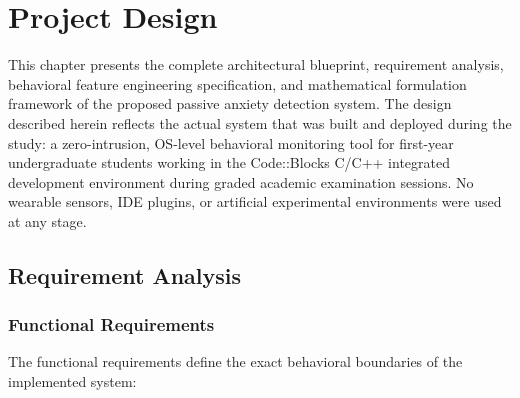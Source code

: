 \chapter{Project Design}
\label{ch:project_design}

This chapter presents the complete architectural blueprint, requirement analysis, behavioral feature engineering specification, and mathematical formulation framework of the proposed passive anxiety detection system. The design described herein reflects the actual system that was built and deployed during the study: a zero-intrusion, OS-level behavioral monitoring tool for first-year undergraduate students working in the Code::Blocks C/C++ integrated development environment during graded academic examination sessions. No wearable sensors, IDE plugins, or artificial experimental environments were used at any stage.

\section{Requirement Analysis}
\label{sec:requirements}

\subsection{Functional Requirements}
The functional requirements define the exact behavioral boundaries of the implemented system:

